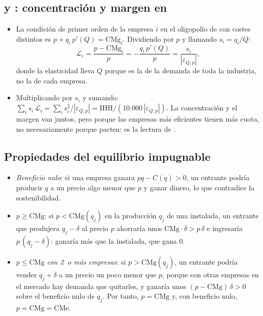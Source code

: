 \documentclass[11pt]{article}
\begin{document}
\subsection{ y : concentración y margen en }\label{anexo:cowling-waterson}

\begin{itemize}
\item La condición de primer orden de la empresa $i$ en el oligopolio de  con costes distintos es $p+q_i\,p'(Q)=\mathrm{CMg}_i$. Dividiendo por $p$ y llamando $s_i=q_i/Q$:
  \[
  \mathcal{L}_i=\frac{p-\mathrm{CMg}_i}{p}=-\frac{q_i\,p'(Q)}{p}=\frac{s_i}{|\varepsilon_{Q,p}|},
  \]
  donde la elasticidad lleva $Q$ porque es la de la demanda de toda la industria, no la de cada empresa.
\item Multiplicando por $s_i$ y sumando: $\sum_i s_i\,\mathcal{L}_i=\sum_i s_i^{2}/|\varepsilon_{Q,p}|=\mathrm{IHH}/(10.000\,|\varepsilon_{Q,p}|)$\nocite{CowlingWaterson1976Price}. La concentración y el margen van juntos, pero porque las empresas más eficientes tienen más cuota, no necesariamente porque pacten: es la lectura de \textcite{Demsetz1973Industry}.\findemo
\end{itemize}

\subsection{Propiedades del equilibrio impugnable}\label{anexo:impugnable}

\begin{itemize}
\item \emph{Beneficio nulo}: si una empresa ganara $pq-C(q)>0$, un entrante podría producir $q$ a un precio algo menor que $p$ y ganar dinero, lo que contradice la sostenibilidad.
\item \emph{$p\geq\mathrm{CMg}$}: si $p<\mathrm{CMg}(q_j)$ en la producción $q_j$ de una instalada, un entrante que produjera $q_j-\delta$ al precio $p$ ahorraría unos $\mathrm{CMg}\cdot\delta>p\,\delta$ e ingresaría $p\,(q_j-\delta)$: ganaría más que la instalada, que gana 0.
\item \emph{$p\leq\mathrm{CMg}$ con 2~o más empresas}: si $p>\mathrm{CMg}(q_j)$, un entrante podría vender $q_j+\delta$ a un precio un poco menor que $p$, porque con otras empresas en el mercado hay demanda que quitarles, y ganaría unos $(p-\mathrm{CMg})\,\delta>0$ sobre el beneficio nulo de $q_j$. Por tanto, $p=\mathrm{CMg}$ y, con beneficio nulo, $p=\mathrm{CMg}=\mathrm{CMe}$\nocite{BaumolPanzarWillig1982Contestable}.\findemo
\end{itemize}
\end{document}
